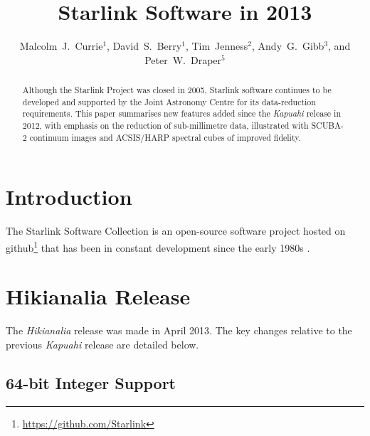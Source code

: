 \documentclass[11pt,twoside]{article}
\begin{document}
\title{Starlink Software in 2013}
\author{Malcolm~J.~Currie$^1$, David~S.~Berry$^1$, Tim~Jenness$^2$,
Andy~G.~Gibb$^3$, and Peter~W.~Draper$^5$
}

\begin{abstract}
  Although the Starlink Project was closed in 2005, Starlink software
  continues to be developed and supported by the Joint Astronomy
  Centre for its data-reduction requirements. This paper summarises
  new features added since the \textit{Kapuahi} release in 2012, with
  emphasis on the reduction of sub-millimetre data, illustrated with
  SCUBA-2 continuum images and ACSIS/HARP spectral cubes of improved
  fidelity.
\end{abstract}

\section{Introduction}

The Starlink Software Collection is an open-source software project
hosted on github\footnote{\url{https://github.com/Starlink}} that has
been in constant development since the early 1980s
\cite{1982QJRAS..23..485D}.

\section{Hikianalia Release}

The \textit{Hikianalia} release was made in April 2013. The key
changes relative to the previous \textit{Kapuahi} release
\citep{P05_adassxxii} are detailed below.

\subsection*{64-bit Integer Support}
\end{document}
